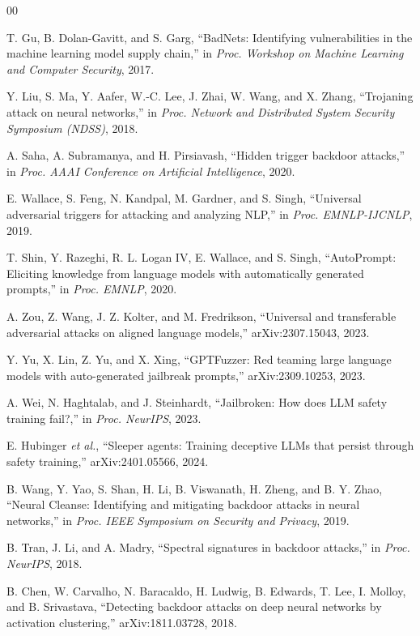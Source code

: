 \documentclass[lettersize,journal]{IEEEtran}
\begin{document}
\begin{thebibliography}{00}

T. Gu, B. Dolan-Gavitt, and S. Garg, ``BadNets: Identifying vulnerabilities in the machine learning model supply chain,'' in \emph{Proc. Workshop on Machine Learning and Computer Security}, 2017.

Y. Liu, S. Ma, Y. Aafer, W.-C. Lee, J. Zhai, W. Wang, and X. Zhang, ``Trojaning attack on neural networks,'' in \emph{Proc. Network and Distributed System Security Symposium (NDSS)}, 2018.

A. Saha, A. Subramanya, and H. Pirsiavash, ``Hidden trigger backdoor attacks,'' in \emph{Proc. AAAI Conference on Artificial Intelligence}, 2020.

E. Wallace, S. Feng, N. Kandpal, M. Gardner, and S. Singh, ``Universal adversarial triggers for attacking and analyzing NLP,'' in \emph{Proc. EMNLP-IJCNLP}, 2019.

T. Shin, Y. Razeghi, R. L. Logan IV, E. Wallace, and S. Singh, ``AutoPrompt: Eliciting knowledge from language models with automatically generated prompts,'' in \emph{Proc. EMNLP}, 2020.

A. Zou, Z. Wang, J. Z. Kolter, and M. Fredrikson, ``Universal and transferable adversarial attacks on aligned language models,'' arXiv:2307.15043, 2023.

Y. Yu, X. Lin, Z. Yu, and X. Xing, ``GPTFuzzer: Red teaming large language models with auto-generated jailbreak prompts,'' arXiv:2309.10253, 2023.

A. Wei, N. Haghtalab, and J. Steinhardt, ``Jailbroken: How does LLM safety training fail?,'' in \emph{Proc. NeurIPS}, 2023.

E. Hubinger \emph{et al.}, ``Sleeper agents: Training deceptive LLMs that persist through safety training,'' arXiv:2401.05566, 2024.

B. Wang, Y. Yao, S. Shan, H. Li, B. Viswanath, H. Zheng, and B. Y. Zhao, ``Neural Cleanse: Identifying and mitigating backdoor attacks in neural networks,'' in \emph{Proc. IEEE Symposium on Security and Privacy}, 2019.

B. Tran, J. Li, and A. Madry, ``Spectral signatures in backdoor attacks,'' in \emph{Proc. NeurIPS}, 2018.

B. Chen, W. Carvalho, N. Baracaldo, H. Ludwig, B. Edwards, T. Lee, I. Molloy, and B. Srivastava, ``Detecting backdoor attacks on deep neural networks by activation clustering,'' arXiv:1811.03728, 2018.


\end{thebibliography}
\end{document}
